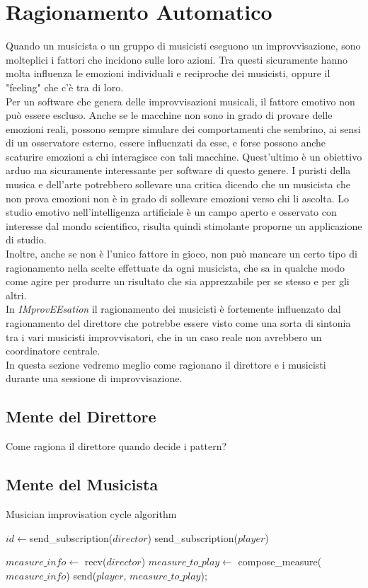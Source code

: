 \section{Ragionamento Automatico}
Quando un musicista o un gruppo di musicisti eseguono un
improvvisazione, sono molteplici i fattori che incidono sulle loro azioni. 
Tra questi sicuramente hanno molta influenza le emozioni
individuali e reciproche dei musicisti, oppure il "feeling" che c'è tra
di loro.\\
Per un software che genera delle improvvisazioni musicali, il fattore 
emotivo non può essere escluso.
Anche se le macchine non sono in grado
di provare delle emozioni reali, possono sempre simulare dei
comportamenti che sembrino, ai sensi di un osservatore esterno, 
essere influenzati da esse, e forse possono anche scaturire emozioni a chi 
interagisce con tali
macchine. Quest'ultimo è un obiettivo arduo ma sicuramente interessante
per software di questo genere. I puristi della musica e dell'arte
potrebbero sollevare una critica dicendo che un musicista che non prova
emozioni non è in grado di sollevare emozioni verso chi li ascolta.
Lo studio emotivo nell'intelligenza artificiale è un campo aperto e
osservato con interesse dal mondo scientifico, risulta quindi stimolante
proporne un applicazione di studio.\\

Inoltre, anche se non è l'unico fattore in gioco, 
non può mancare un certo tipo di ragionamento
nella scelte effettuate da ogni musicista, che sa in qualche modo come
agire per produrre un risultato che sia apprezzabile per se stesso e per gli
altri.\\
In \emph{IMprovEEsation} il ragionamento dei musicisti è fortemente influenzato
dal ragionamento del direttore che potrebbe essere visto come una sorta
di sintonia tra i vari musicisti improvvisatori, che in
un caso reale non avrebbero un coordinatore centrale.\\
In questa sezione vedremo meglio come ragionano il direttore e i
musicisti durante una sessione di improvvisazione.
\label{thinking}
\subsection{Mente del Direttore}
Come ragiona il direttore quando decide i pattern?
\subsection{Mente del Musicista}
\begin{algorithm}
\caption{Musician improvisation cycle algorithm}\label{algo-musician}
\begin{algorithmic}[1]
	\State $id \gets$send\_subscription($director$)
	\State send\_subscription($player$)
	
	\State $measure\_info \gets$ recv($director$)
	\State $measure\_to\_play \gets$ compose\_measure($measure\_info$)
	\State send($player$, $measure\_to\_play$);
	\EndWhile
\EndFunction
\end{algorithmic}
\end{algorithm}


